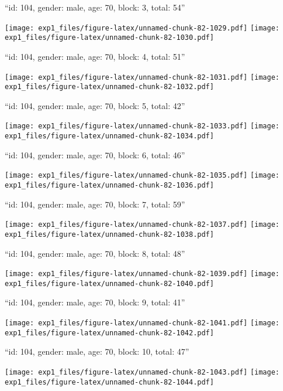 \documentclass[11pt,,]{article}
\begin{document}
\newpage
[1] 

``id: 104, gender: male, age: 70, block: 3, total: 54''

\texttt{[image: exp1\_files/figure-latex/unnamed-chunk-82-1029.pdf]}
\texttt{[image: exp1\_files/figure-latex/unnamed-chunk-82-1030.pdf]}

\newpage
[1] 

``id: 104, gender: male, age: 70, block: 4, total: 51''

\texttt{[image: exp1\_files/figure-latex/unnamed-chunk-82-1031.pdf]}
\texttt{[image: exp1\_files/figure-latex/unnamed-chunk-82-1032.pdf]}

\newpage
[1] 

``id: 104, gender: male, age: 70, block: 5, total: 42''

\texttt{[image: exp1\_files/figure-latex/unnamed-chunk-82-1033.pdf]}
\texttt{[image: exp1\_files/figure-latex/unnamed-chunk-82-1034.pdf]}

\newpage
[1] 

``id: 104, gender: male, age: 70, block: 6, total: 46''

\texttt{[image: exp1\_files/figure-latex/unnamed-chunk-82-1035.pdf]}
\texttt{[image: exp1\_files/figure-latex/unnamed-chunk-82-1036.pdf]}

\newpage
[1] 

``id: 104, gender: male, age: 70, block: 7, total: 59''

\texttt{[image: exp1\_files/figure-latex/unnamed-chunk-82-1037.pdf]}
\texttt{[image: exp1\_files/figure-latex/unnamed-chunk-82-1038.pdf]}

\newpage
[1] 

``id: 104, gender: male, age: 70, block: 8, total: 48''

\texttt{[image: exp1\_files/figure-latex/unnamed-chunk-82-1039.pdf]}
\texttt{[image: exp1\_files/figure-latex/unnamed-chunk-82-1040.pdf]}

\newpage
[1] 

``id: 104, gender: male, age: 70, block: 9, total: 41''

\texttt{[image: exp1\_files/figure-latex/unnamed-chunk-82-1041.pdf]}
\texttt{[image: exp1\_files/figure-latex/unnamed-chunk-82-1042.pdf]}

\newpage
[1] 

``id: 104, gender: male, age: 70, block: 10, total: 47''

\texttt{[image: exp1\_files/figure-latex/unnamed-chunk-82-1043.pdf]}
\texttt{[image: exp1\_files/figure-latex/unnamed-chunk-82-1044.pdf]}
\end{document}
